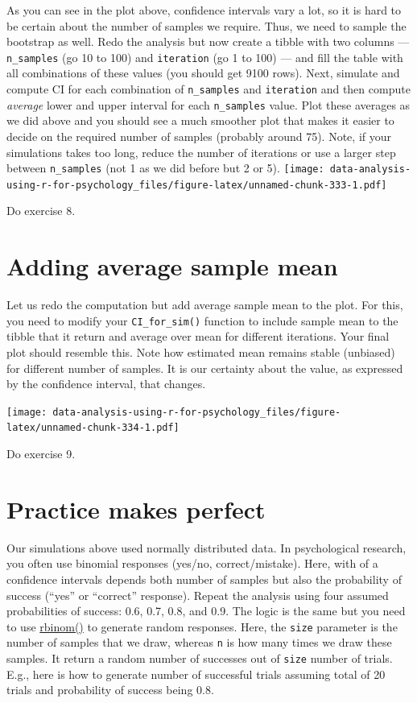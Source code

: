\documentclass[
]{book}
\begin{document}
As you can see in the plot above, confidence intervals vary a lot, so it is hard to be certain about the number of samples we require. Thus, we need to sample the bootstrap as well. Redo the analysis but now create a tibble with two columns --- \texttt{n\_samples} (go 10 to 100) and \texttt{iteration} (go 1 to 100) --- and fill the table with all combinations of these values (you should get 9100 rows). Next, simulate and compute CI for each combination of \texttt{n\_samples} and \texttt{iteration} and then compute \emph{average} lower and upper interval for each \texttt{n\_samples} value. Plot these averages as we did above and you should see a much smoother plot that makes it easier to decide on the required number of samples (probably around 75). Note, if your simulations takes too long, reduce the number of iterations or use a larger step between \texttt{n\_samples} (not 1 as we did before but 2 or 5).
\texttt{[image: data-analysis-using-r-for-psychology\_files/figure-latex/unnamed-chunk-333-1.pdf]}

Do exercise 8.

\hypertarget{adding-average-sample-mean}{%
\section{Adding average sample mean}\label{adding-average-sample-mean}}

Let us redo the computation but add average sample mean to the plot. For this, you need to modify your \texttt{CI\_for\_sim()} function to include sample mean to the tibble that it return and average over mean for different iterations. Your final plot should resemble this. Note how estimated mean remains stable (unbiased) for different number of samples. It is our certainty about the value, as expressed by the confidence interval, that changes.

\texttt{[image: data-analysis-using-r-for-psychology\_files/figure-latex/unnamed-chunk-334-1.pdf]}

Do exercise 9.

\hypertarget{practice-makes-perfect}{%
\section{Practice makes perfect}\label{practice-makes-perfect}}

Our simulations above used normally distributed data. In psychological research, you often use binomial responses (yes/no, correct/mistake). Here, with of a confidence intervals depends both number of samples but also the probability of success (``yes'' or ``correct'' response). Repeat the analysis using four assumed probabilities of success: 0.6, 0.7, 0.8, and 0.9. The logic is the same but you need to use \href{https://stat.ethz.ch/R-manual/R-devel/library/stats/html/Binomial.html}{rbinom()} to generate random responses. Here, the \texttt{size} parameter is the number of samples that we draw, whereas \texttt{n} is how many times we draw these samples. It return a random number of successes out of \texttt{size} number of trials. E.g., here is how to generate number of successful trials assuming total of 20 trials and probability of success being 0.8.
\end{document}
